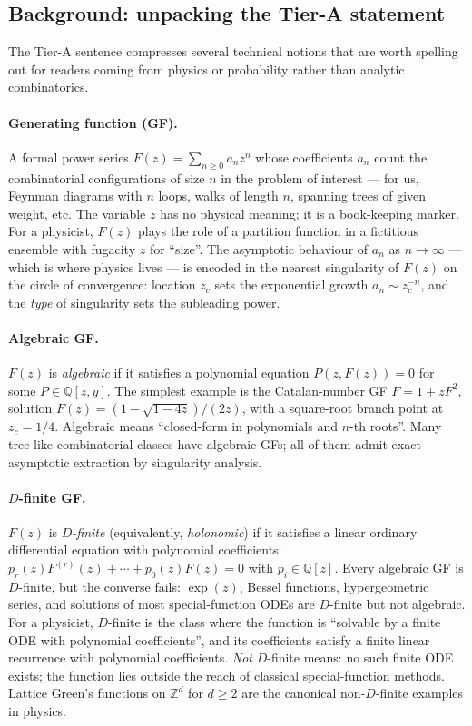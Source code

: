 \documentclass[10pt,a4paper,twocolumn]{article}
\theoremstyle{plain}
\theoremstyle{definition}
\begin{document}
\subsection*{Background: unpacking the Tier-A statement}
\label{sec:intro-bg}

The Tier-A sentence compresses several technical notions that are
worth spelling out for readers coming from physics or probability
rather than analytic combinatorics.

\paragraph{Generating function (GF).}
A formal power series $F(z) = \sum_{n \geq 0} a_n z^n$ whose
coefficients $a_n$ count the combinatorial configurations of size
$n$ in the problem of interest --- for us, Feynman diagrams with
$n$ loops, walks of length $n$, spanning trees of given weight,
etc.  The variable $z$ has no physical meaning; it is a
book-keeping marker.  For a physicist, $F(z)$ plays the role of
a partition function in a fictitious ensemble with fugacity $z$
for ``size''.  The asymptotic behaviour of $a_n$ as $n \to \infty$
--- which is where physics lives --- is encoded in the nearest
singularity of $F(z)$ on the circle of convergence: location
$z_c$ sets the exponential growth $a_n \sim z_c^{-n}$, and the
\emph{type} of singularity sets the subleading power.

\paragraph{Algebraic GF.}
$F(z)$ is \emph{algebraic} if it satisfies a polynomial equation
$P(z, F(z)) = 0$ for some $P \in \mathbb{Q}[z, y]$.  The simplest
example is the Catalan-number GF
$F = 1 + z F^2$, solution $F(z) = (1 - \sqrt{1 - 4z}) / (2z)$,
with a square-root branch point at $z_c = 1/4$.  Algebraic means
``closed-form in polynomials and $n$-th roots''.  Many tree-like
combinatorial classes have algebraic GFs; all of them admit exact
asymptotic extraction by singularity analysis.

\paragraph{$D$-finite GF.}
$F(z)$ is \emph{$D$-finite} (equivalently, \emph{holonomic}) if it
satisfies a linear ordinary differential equation with polynomial
coefficients:
$p_r(z) F^{(r)}(z) + \cdots + p_0(z) F(z) = 0$
with $p_i \in \mathbb{Q}[z]$.  Every algebraic GF is $D$-finite,
but the converse fails: $\exp(z)$, Bessel functions,
hypergeometric series, and solutions of most special-function
ODEs are $D$-finite but not algebraic.  For a physicist, $D$-finite
is the class where the function is ``solvable by a finite
ODE with polynomial coefficients'', and its coefficients satisfy
a finite linear recurrence with polynomial coefficients.
\emph{Not} $D$-finite means: no such finite ODE exists; the
function lies outside the reach of classical special-function
methods.  Lattice Green's functions on $\mathbb{Z}^d$ for
$d \geq 2$ are the canonical non-$D$-finite examples in physics.
\end{document}
